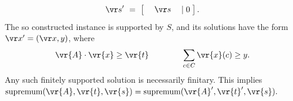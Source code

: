 \vspace{-4mm}
\begin{align*}
\vr s' \ = \ 
\left[ 
\begin{matrix}
& \;   \vr s  \; & 
\end{matrix}
\rvert
\; 0 \;  
\right].
\end{align*}
%
The so constructed instance is supported by $S$, and its solutions have the form $\vr x' = (\vr x, y)$, where
\[
\vr{A} \cdot \vr{x} \geq \vr{t} \qquad\qquad \sum_{c \in C} \vr{x}(c) \geq y.
\]
Any such finitely supported solution is necessarily finitary.
This implies
$
\textnormal{supremum}(\vr{A},\vr{t},\vr{s}) =
\textnormal{supremum}(\vr{A}',\vr{t}',\vr{s}).
$
%


%

